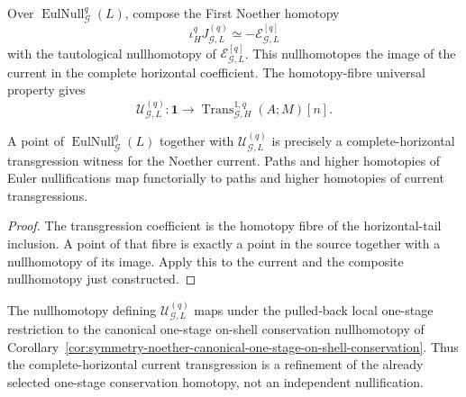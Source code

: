 \begin{construction}
\label{constr:symmetry-noether-native-on-shell-noether-transgression}
Over $\operatorname{EulNull}_{\mathcal G}^{q}(L)$, compose the First Noether
homotopy
\[
\iota_H^qJ_{\mathcal G,L}^{(q)}
\simeq
-\mathscr E_{\mathcal G,L}^{[q]}
\]
with the tautological nullhomotopy of
$\mathscr E_{\mathcal G,L}^{[q]}$.  This nullhomotopes the image of the current in the
complete horizontal coefficient.  The homotopy-fibre universal property gives
\[
\boxed{
\mathcal U_{\mathcal G,L}^{(q)}:
\mathbf1
\longrightarrow
\operatorname{Trans}_{\mathcal G,H}^{1,q}(A;M)[n].
}
\]
\end{construction}

\begin{proposition}
\label{prop:symmetry-noether-meaning-of-the-native-transgression}
A point of $\operatorname{EulNull}_{\mathcal G}^{q}(L)$ together with
$\mathcal U_{\mathcal G,L}^{(q)}$ is precisely a complete-horizontal
transgression witness for the Noether current.  Paths and higher homotopies of
Euler nullifications map functorially to paths and higher homotopies of current
transgressions.
\end{proposition}

\begin{proof}
The transgression coefficient is the homotopy fibre of the horizontal-tail
inclusion.  A point of that fibre is exactly a point in the source together with
a nullhomotopy of its image.  Apply this to the current and the composite
nullhomotopy just constructed.
\end{proof}

\begin{proposition}
\label{prop:symmetry-noether-complete-transgression-refines-selected-one-stage-conservation}
The nullhomotopy defining
$\mathcal U_{\mathcal G,L}^{(q)}$ maps under the pulled-back local one-stage
restriction to the canonical one-stage on-shell conservation nullhomotopy of
Corollary~\ref{cor:symmetry-noether-canonical-one-stage-on-shell-conservation}.
Thus the complete-horizontal current transgression is a refinement of the
already selected one-stage conservation homotopy, not an independent
nullification.
\end{proposition}


